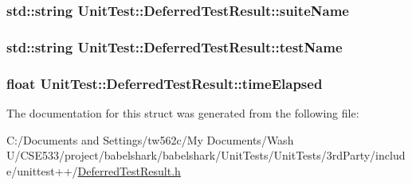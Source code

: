 \hypertarget{struct_unit_test_1_1_deferred_test_result_d9c83c05fb8c2d81753ed5e765db0bc3}{
\subsubsection[{suiteName}]{\setlength{\rightskip}{0pt plus 5cm}std::string {\bf UnitTest::DeferredTestResult::suiteName}}}
\label{struct_unit_test_1_1_deferred_test_result_d9c83c05fb8c2d81753ed5e765db0bc3}


\hypertarget{struct_unit_test_1_1_deferred_test_result_2e491a75905c60c3c3b1022060a5a1f0}{
\subsubsection[{testName}]{\setlength{\rightskip}{0pt plus 5cm}std::string {\bf UnitTest::DeferredTestResult::testName}}}
\label{struct_unit_test_1_1_deferred_test_result_2e491a75905c60c3c3b1022060a5a1f0}


\hypertarget{struct_unit_test_1_1_deferred_test_result_09cb77930cd0ee30c05118bfebb27f51}{
\subsubsection[{timeElapsed}]{\setlength{\rightskip}{0pt plus 5cm}float {\bf UnitTest::DeferredTestResult::timeElapsed}}}
\label{struct_unit_test_1_1_deferred_test_result_09cb77930cd0ee30c05118bfebb27f51}




The documentation for this struct was generated from the following file:\begin{CompactItemize}
\item 
C:/Documents and Settings/tw562c/My Documents/Wash U/CSE533/project/babelshark/babelshark/UnitTests/UnitTests/3rdParty/include/unittest++/\hyperlink{_deferred_test_result_8h}{DeferredTestResult.h}\end{CompactItemize}
